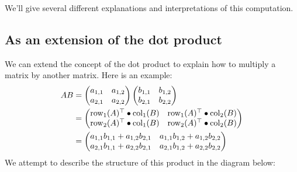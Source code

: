 \documentclass{ximera}
\begin{document}
We'll give several different explanations and interpretations of this
computation.

\subsection{As an extension of the dot product}
We can extend the concept of the dot product to explain how to
multiply a matrix by another matrix. Here is an example:
\begin{align*}AB &= \begin{pmatrix}
a_{1,1} & a_{1,2}\\
a_{2,1} & a_{2,2}
\end{pmatrix}
\begin{pmatrix}
b_{1,1} & b_{1,2}\\
b_{2,1} & b_{2,2}
\end{pmatrix}\\
&= \begin{pmatrix}
\operatorname{row}_1(A)^\top \bullet\operatorname{col}_1(B) & \operatorname{row}_1(A)^\top\bullet\operatorname{col}_2(B)\\
\operatorname{row}_2(A)^\top \bullet\operatorname{col}_1(B) & \operatorname{row}_2(A)^\top\bullet\operatorname{col}_2(B)
\end{pmatrix}\\
&= \begin{pmatrix}
a_{1,1}b_{1,1} + a_{1,2}b_{2,1} & a_{1,1}b_{1,2}+ a_{1,2}b_{2,2}\\
a_{2,1}b_{1,1} + a_{2,2}b_{2,1} & a_{2,1}b_{1,2} + a_{2,2}b_{2,2}
\end{pmatrix}
\end{align*}
We attempt to describe the structure of this product in the diagram below:
\end{document}
